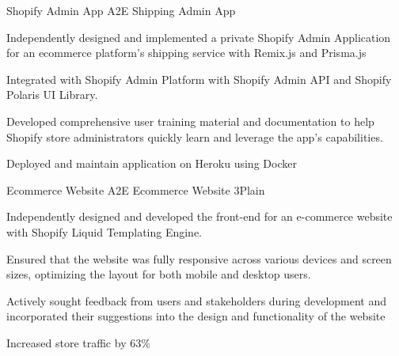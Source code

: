 \begin{cventries}
  \cventry
  {Shopify Admin App} %
  {A2E Shipping Admin App} %
  {}
  {
    \disRemix
    \diTypescriptPlain
    \diGraphqlPlain
    \disPrisma
    \diHerokuPlain
    \diDockerPlain
    \hspace{0.1cm}
    
  } %
  {
    \begin{cvitems} %
      \item Independently designed and implemented a private Shopify Admin Application for
      an ecommerce platform's shipping service with Remix.js and Prisma.js
      \item Integrated with Shopify Admin Platform with Shopify Admin API and Shopify
      Polaris UI Library.
      \item Developed comprehensive user training material and documentation to help
      Shopify store administrators quickly learn and leverage the app's capabilities.
      \item Deployed and maintain application on Heroku using Docker
    \end{cvitems}
  }
  \cventry
  {Ecommerce Website} %
  {A2E Ecommerce Website} %
  {\href{https://a2eshop.sg/}{\faEye}}
  {
    \diHtmlFivePlain
    \diCss3Plain
    \diJavascriptPlain
  } %
  {
    \begin{cvitems} %
      \item Independently designed and developed the front-end for an e-commerce website
      with Shopify Liquid Templating Engine.
      \item Ensured that the website was fully responsive across various devices and screen
      sizes, optimizing the layout for both mobile and desktop users.
      \item Actively sought feedback from users and stakeholders during development and
      incorporated their suggestions into the design and functionality of the website
      \item Increased store traffic by 63\%
    \end{cvitems}
  }

\end{cventries}
